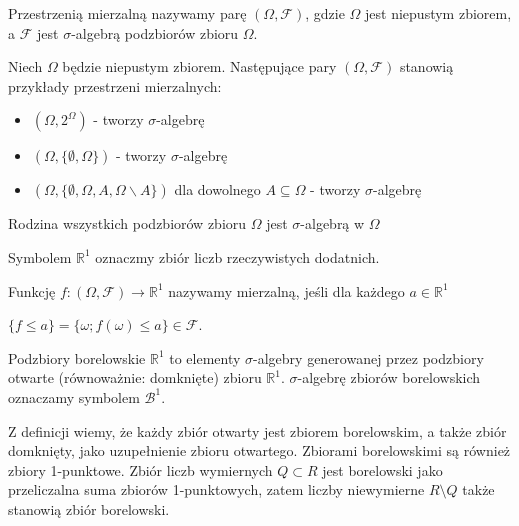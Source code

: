 \begin{definicja}
	Przestrzenią mierzalną nazywamy parę $(\Omega, \mathcal{F})$, gdzie $\Omega$ jest niepustym zbiorem, a $\mathcal{F}$ jest $\sigma$-algebrą podzbiorów zbioru $\Omega$.
\end{definicja}

\begin{przyklad}
	Niech $ \Omega $ będzie niepustym zbiorem. Następujące pary $(\Omega, \mathcal{F})$ stanowią przykłady przestrzeni mierzalnych:
	\begin{itemize}
	
		\item $(\Omega, 2^{\Omega})$ - tworzy $\sigma$-algebrę
		\item $(\Omega, \{ \emptyset, \Omega\})$ - tworzy $\sigma$-algebrę
		\item $(\Omega, \{ \emptyset, \Omega, A, \Omega \backslash A \})$ dla dowolnego $ A \subseteq \Omega$ - tworzy $\sigma$-algebrę

	\end{itemize}
	
\end{przyklad}

\begin{przyklad}
	Rodzina wszystkich podzbiorów zbioru $\Omega$ jest $\sigma$-algebrą w $\Omega$
\end{przyklad}

Symbolem $\mathbb{R}^{1}$ oznaczmy zbiór liczb rzeczywistych dodatnich.
\begin{definicja}
	Funkcję $f:  (\Omega, \mathcal{F}) \to \mathbb{R}^{1}$ nazywamy mierzalną, jeśli dla każdego $a \in \mathbb{R}^{1}$
\end{definicja}
{\centering
	$\{f \le a\} = \{ \omega; f(\omega) \le a \} \in \mathcal{F}. $\par
}

\begin{definicja}
	Podzbiory borelowskie $\mathbb{R}^{1}$ to elementy $\sigma$-algebry generowanej przez podzbiory otwarte (równoważnie: domknięte) zbioru $\mathbb{R}^{1}$.  $\sigma$-algebrę zbiorów borelowskich oznaczamy symbolem $\mathcal{B}^{1}$.																
\end{definicja}

\begin{przyklad}
Z definicji wiemy, że każdy zbiór otwarty jest zbiorem borelowskim, a także zbiór domknięty, jako uzupełnienie zbioru otwartego. Zbiorami borelowskimi są również zbiory 1-punktowe. Zbiór liczb wymiernych $Q \subset R$ jest borelowski jako przeliczalna suma zbiorów 1-punktowych, zatem liczby niewymierne $ R \setminus Q$ także stanowią zbiór borelowski.
\end{przyklad}

